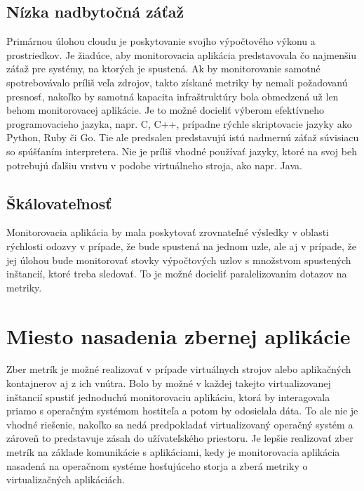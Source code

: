 \documentclass[12pt,twoside,color,cover,table]{fithesis3}
\begin{document}
\subsection{Nízka nadbytočná záťaž}
Primárnou úlohou cloudu je poskytovanie svojho výpočtového výkonu a prostriedkov. Je žiadúce, aby monitorovacia aplikácia predstavovala čo najmenšiu záťaž pre systémy, na ktorých je spustená. Ak by monitorovanie
samotné spotrebovávalo príliš veľa zdrojov, takto získané metriky by nemali požadovanú presnosť, nakoľko by samotná kapacita infraštruktúry bola obmedzená už len behom
monitorovacej aplikácie. Je to možné docieliť výberom efektívneho programovacieho jazyka, napr. C, C++, prípadne rýchle skriptovacie 
jazyky ako Python, Ruby či Go. Tie ale predsalen predstavujú istú nadmernú záťaž súvisiacu so spúšťaním interpretera. 
Nie je príliš vhodné používať jazyky, ktoré na svoj beh potrebujú ďalšiu vrstvu v podobe virtuálneho stroja, ako napr. Java.

\subsection{Škálovateľnosť}
Monitorovacia aplikácia by mala poskytovať zrovnateľné výsledky v oblasti rýchlosti odozvy v prípade, že bude spustená na jednom uzle, ale aj v prípade, že jej úlohou bude monitorovať stovky 
výpočtových uzlov s množstvom spustených inštancií, ktoré treba sledovať. To je možné docieliť paralelizovaním dotazov na metriky.

\section{Miesto nasadenia zbernej aplikácie}
Zber metrík je možné realizovať v prípade virtuálnych strojov alebo aplikačných kontajnerov aj z ich vnútra. Bolo by možné v každej
takejto virtualizovanej inštancií spustiť jednoduchú monitorovaciu aplikáciu, ktorá by interagovala priamo s operačným systémom hostiteľa a potom by odosielala dáta.
To ale nie je vhodné riešenie, nakoľko sa nedá predpokladať virtualizovaný operačný systém a zároveň to predstavuje zásah do užívateľského
priestoru. Je lepšie realizovať zber metrík na základe komunikácie s aplikáciami, kedy je monitorovacia aplikácia nasadená na operačnom systéme hosťujúceho storja a zberá metriky o virtualizačných aplikáciách.
\end{document}
